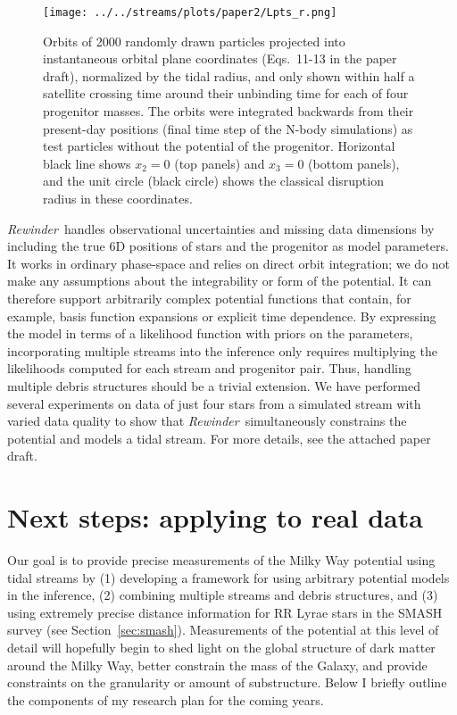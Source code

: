 \documentclass[letterpaper,12pt,preprint]{aastex}
\newcommand{\rewinder}{\emph{Rewinder}}
\begin{document}
\begin{figure}[h]
\begin{center}
\texttt{[image: ../../streams/plots/paper2/Lpts\_r.png]}
\caption{ Orbits of 2000 randomly drawn particles projected into instantaneous orbital plane coordinates (Eqs.~11-13 in the paper draft), normalized by the tidal radius, and only shown within half a satellite crossing time around their unbinding time for each of four progenitor masses. The orbits were integrated backwards from their present-day positions (final time step of the N-body simulations) as test particles without the potential of the progenitor. Horizontal black line shows $x_2=0$ (top panels) and $x_3=0$ (bottom panels), and the unit circle (black circle) shows the classical disruption radius in these coordinates. }\label{fig:lpts_r}
\end{center}
\end{figure}

\rewinder\ handles observational uncertainties and missing data dimensions by including the true 6D positions of stars and the progenitor as model parameters. It works in ordinary phase-space and relies on direct orbit integration; we do not make any assumptions about the integrability or form of the potential. It can therefore support arbitrarily complex potential functions that contain, for example, basis function expansions or explicit time dependence. By expressing the model in terms of a likelihood function with priors on the parameters, incorporating multiple streams into the inference only requires multiplying the likelihoods computed for each stream and progenitor pair. Thus, handling multiple debris structures should be a trivial extension. We have performed several experiments on data of just four stars from a simulated stream with varied data quality to show that \rewinder\ simultaneously constrains the potential and models a tidal stream. For more details, see the attached paper draft. 

\section{Next steps: applying to real data}

Our goal is to provide precise measurements of the Milky Way potential using tidal streams by (1) developing a framework for using arbitrary potential models in the inference, (2) combining multiple streams and debris structures, and (3) using extremely precise distance information for RR Lyrae stars in the SMASH survey (see Section~\ref{sec:smash}). Measurements of the potential at this level of detail will hopefully begin to shed light on the global structure of dark matter around the Milky Way, better constrain the mass of the Galaxy, and provide constraints on the granularity or amount of substructure. Below I briefly outline the components of my research plan for the coming years.
\end{document}
